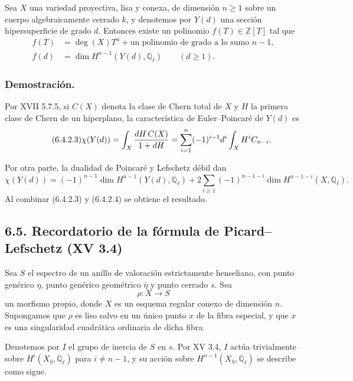 Sea $X$ una variedad proyectiva, lisa y conexa, de dimensión $n\ge1$
sobre un cuerpo algebraicamente cerrado $k$, y denotemos por $Y(d)$ una
sección hipersuperficie de grado $d$. Entonces existe un polinomio
$f(T)\in\mathbb Z[T]$ tal que
\begin{align}
f(T)&=\deg(X)T^n+\text{un polinomio de grado a lo sumo }n-1,
  \tag{6.4.2.1}\\
f(d)&=\dim H^{n-1}(Y(d),\mathbb Q_\ell)\qquad(d\ge1).
  \tag{6.4.2.2}
\end{align}

\subsubsection*{Demostración.}

Por XVII 5.7.5, si $C(X)$ denota la clase de Chern total de $X$ y $H$
la primera clase de Chern de un hiperplano, la característica de
Euler--Poincaré de $Y(d)$ es
\begin{equation}\tag{6.4.2.3}
\sisi{\chi(Y(d)}{\chi(Y(d))}
=\int_X\frac{dH\,C(X)}{1+dH}
=\sum_{i=1}^{n}(-1)^{i-1}d^i\int_X H^iC_{n-i}.
\end{equation}

\pageoriginale

Por otra parte, la dualidad de Poincaré y Lefschetz débil dan
{\small\begin{equation}\tag{6.4.2.4}
\chi(Y(d))
=(-1)^{n-1}\dim H^{n-1}(Y(d),\mathbb Q_\ell)
+2\sum_{i\ge1}(-1)^{n-1-i}
  \dim H^{n-1-i}(X,\mathbb Q_\ell).
\end{equation}}
Al combinar (6.4.2.3) y (6.4.2.4) se obtiene el resultado.

\subsection*{6.5. Recordatorio de la fórmula de Picard--Lefschetz
(XV 3.4)}

Sea $S$ el espectro de un anillo de valoración estrictamente
henseliano, con punto genérico $\eta$, punto genérico geométrico
$\bar\eta$ y punto cerrado $s$. Sea
\[
\rho:X\longrightarrow S
\]
un morfismo propio, donde $X$ es un esquema regular conexo de dimensión
$n$. Supongamos que $\rho$ es liso salvo en un único punto $x$ de la
fibra especial, y que $x$ es una singularidad cuadrática ordinaria de
dicha fibra.

Denotemos por $I$ el grupo de inercia de $S$ en $s$. Por XV 3.4, $I$
actúa trivialmente sobre $H^i(X_{\bar\eta},\mathbb Q_\ell)$ para
$i\ne n-1$, y su acción sobre
$H^{n-1}(X_{\bar\eta},\mathbb Q_\ell)$ se describe como sigue.

